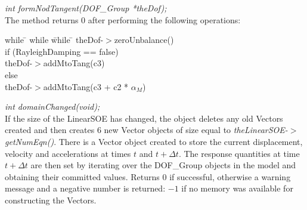 {\em int formNodTangent(DOF\_Group *theDof);} \\
The method returns $0$ after performing the following operations:
\begin{tabbing}
while \= \+ while \= while \= \kill
theDof-$>$zeroUnbalance() \\
if (RayleighDamping == false)  \+ \\
theDof-$>$addMtoTang(c3)  \- \\
else \+ \\
theDof-$>$addMtoTang(c3 + c2 * $\alpha_M$)  \- \\ 
\end{tabbing}


{\em int domainChanged(void);}\\
If the size of the LinearSOE has changed, the object deletes any old Vectors
created and then creates $6$ new Vector objects of size equal to {\em
theLinearSOE-$>$getNumEqn()}. There is a Vector object created to store
the current displacement, velocity and accelerations at times $t$ and
$t + \Delta t$. The response quantities at time $t + \Delta t$ are
then set by iterating over the DOF\_Group objects in the model and
obtaining their committed values. 
Returns $0$ if successful, otherwise a warning message and a negative
number is returned: $-1$ if no memory was available for constructing
the Vectors. \\

